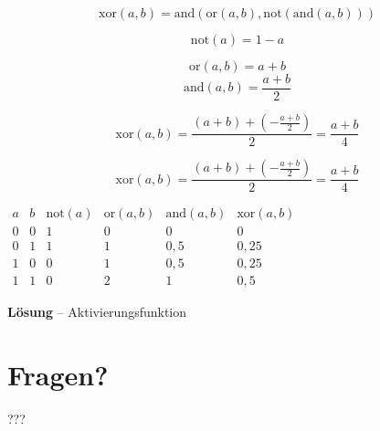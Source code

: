 \documentclass{beamer}
\begin{document}
\begin{frame}{\insertsection}{\insertsubsection}
	
	$$\mathrm{xor}(a,b) = \mathrm{and}(\mathrm{or}(a,b), \mathrm{not}(\mathrm{and}(a,b))) $$
	
	$$\mathrm{not}(a) = 1-a$$
	
	$$\mathrm{or}(a,b) = a+b$$ 
	$$\mathrm{and}(a,b) = \frac{a+b}{2}$$
	
	$$\mathrm{xor}(a,b) = \frac{\left(a + b\right) + \left(- \frac{a+b}{2}\right)}{2} = \frac{a+b}{4}$$
	
	
\end{frame}

\begin{frame}{\insertsection}{\insertsubsection}
	
	$$\mathrm{xor}(a,b) = \frac{\left(a + b\right) + \left(- \frac{a+b}{2}\right)}{2} = \frac{a+b}{4}$$	
	
	\bigskip
	
	$\begin{array}{cccccc}
	a	& b  & \mathrm{not}(a) & \mathrm{or}(a,b) & \mathrm{and}(a,b)  & \mathrm{xor}(a,b) \\ 
	0	& 0  & 1      & 0 & 0 & 0 \\ 
	0	& 1  & 1      & 1 & 0,5 & 0,25 \\ 
	1	& 0  & 0      & 1 & 0,5 & 0,25 \\ 
	1	& 1  & 0      & 2 & 1 & 0,5
	\end{array} $
	
\end{frame}

\begin{frame}{\insertsection}{\insertsubsection}
	
\textbf{Lösung} -- Aktivierungsfunktion
	
\end{frame}

\section{Fragen?}
\begin{frame}{\insertsection}{\insertsubsection}
	???
\end{frame}
\end{document}
